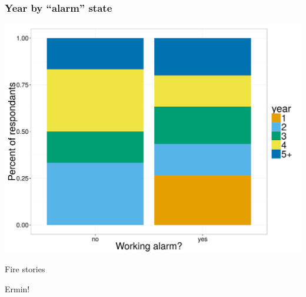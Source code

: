 \documentclass{beamer}
\begin{document}
\begin{frame}
  \frametitle{Year by ``alarm'' state}
  \begin{center}
    \includegraphics[width=\textwidth,height=0.8\textheight,keepaspectratio=true]{work_alm}
  \end{center}
\end{frame}

\begin{frame}
  \Large{Fire stories}
\end{frame}

\begin{frame}
  \Large{Ermin!}
\end{frame}
\end{document}
